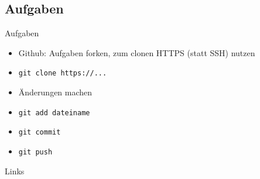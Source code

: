 \documentclass[18pt]{beamer}
\begin{document}
\subsection{Aufgaben}
\begin{frame}[fragile]{Aufgaben}
\begin{itemize}
\item Github: Aufgaben forken, zum clonen HTTPS (statt SSH) nutzen
\item \verb|git clone https://...|
\item Änderungen machen
\item \verb|git add dateiname|
\item \verb|git commit|
\item \verb|git push|
\end{itemize}
\end{frame}

\appendix
\beginbackup

\begin{frame}[allowframebreaks]{Links}
\end{frame}

\backupend
\end{document}
